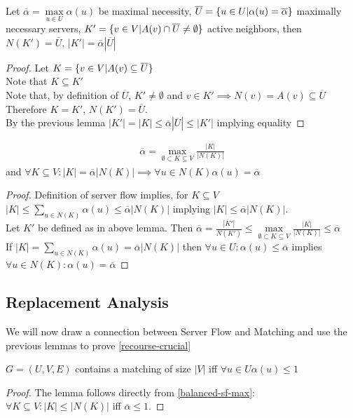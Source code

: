 \begin{lemma}
	Let $\overline{\alpha}=\underset{u\in U}{\max}\alpha(u)$ be maximal necessity, $\overline{U}=\{u\in U|\alpha(u)=\overline{\alpha}\}$ maximally necessary servers, $K'=\{v\in V|A(v)\cap\overline{U}\neq\emptyset\}$ active neighbors, then $N(K')=\overline{U}$, $|K'|=\overline{\alpha}|\overline{U}|$
\end{lemma}
\begin{proof}
	Let $K=\{v\in V|A(v)\subseteq\overline{U}\}$\\
	Note that $K\subseteq K'$\\
	Note that, by definition of $\overline{U}$, $K'\neq\emptyset$ and $v\in K'\implies N(v)=A(v)\subseteq\overline{U}$\\
	Therefore $K=K'$, $N(K')=\overline{U}$.\\
	By the previous lemma $|K'|=|K|\leq\overline{\alpha}|\overline{U}|\leq|K'|$ implying equality
\end{proof}

\begin{lemma}
	\label{balanced-sf-max}
	\begin{align*}
		\overline{\alpha}=\underset{\emptyset\subset K\subseteq V}{\max}\frac{|K|}{|N(K)|}
	\end{align*}
	and $\forall K\subseteq V:|K|=\overline{\alpha}|N(K)|\implies\forall u\in N(K)\alpha(u)=\overline{\alpha}$
\end{lemma}
\begin{proof}
	Definition of server flow implies, for $K\subseteq V$ $|K|\leq\sum\limits_{u\in N(K)}\alpha(u)\leq\overline{\alpha}|N(K)|$ implying $|K|\leq\overline{\alpha}|N(K)|$.\\
	Let $K'$ be defined as in above lemma. Then $\overline{\alpha}=\frac{|K'|}{N(K')}\leq\underset{\emptyset\subset K\subseteq V}{\max}\frac{|K|}{|N(K)|}\leq\overline{\alpha}$\\
	If $|K|=\sum\limits_{u\in N(K)}\alpha(u)=\overline{\alpha}|N(K)|$ then $\forall u\in U:\alpha(u)\leq\overline{\alpha}$ implies $\forall u\in N(K):\alpha(u)=\overline{\alpha}$
\end{proof}

\subsection{Replacement Analysis}
We will now draw a connection between Server Flow and Matching and use the previous lemmas to prove \autoref{recourse-crucial}

\begin{lemma}
	$G=(U,V,E)$ contains a matching of size $|V|$ iff $\forall u\in U\alpha(u)\leq 1$
\end{lemma}
\begin{proof}
	The lemma follows directly from \autoref{balanced-sf-max}: $\forall K\subseteq V:|K|\leq |N(K)|$ iff $\overline{\alpha}\leq 1$.
\end{proof}

